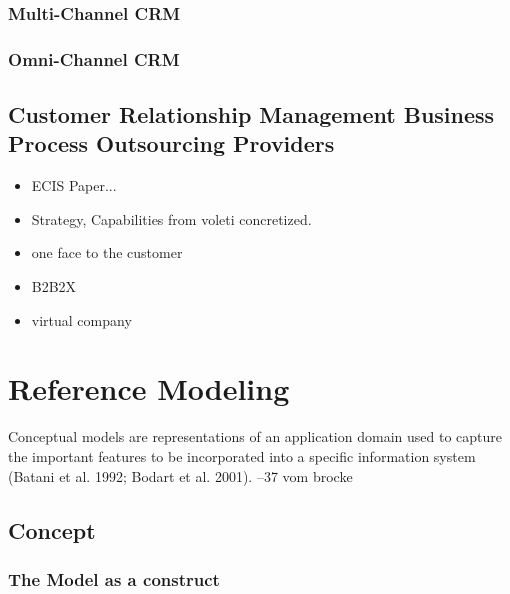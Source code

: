 	\subsubsection{Multi-Channel CRM}
	\subsubsection{Omni-Channel CRM}
	 
		\subsection{Customer Relationship Management Business Process Outsourcing Providers}
		\begin{itemize}
			\item ECIS Paper...
			\item Strategy, Capabilities from voleti concretized. 
			\item one face to the customer
			\item B2B2X
			\item virtual company
		\end{itemize}
	\section{Reference Modeling}
	\label{sec:03_refmod}
		
Conceptual models are representations of an application domain used to capture the important features to be incorporated into a specific information system (Batani et al. 1992; Bodart et al. 2001). --37 vom brocke


		\subsection{Concept}
		
		\subsubsection{The Model as a construct}
		
		
		

